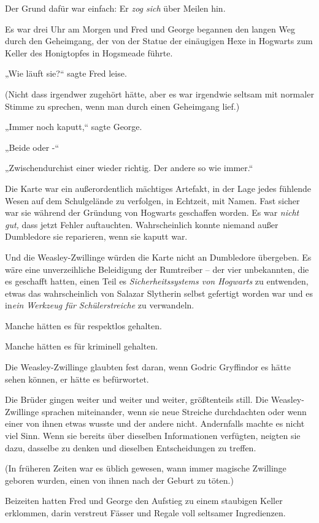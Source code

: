 {Der Grund dafür war einfach: Er \emph{zog sich} über Meilen hin.

Es war drei Uhr am Morgen und Fred und George begannen den langen Weg durch den Geheimgang, der von der Statue der einäugigen Hexe in Hogwarts zum Keller des Honigtopfes in Hogsmeade führte.

„Wie läuft sie?“ sagte Fred leise.

(Nicht dass irgendwer zugehört hätte, aber es war irgendwie seltsam mit normaler Stimme zu sprechen, wenn man durch einen Geheimgang lief.)

„Immer noch kaputt,“ sagte George.

„Beide oder -“

„Zwischendurchist einer wieder richtig. Der andere so wie immer.“

Die Karte war ein außerordentlich mächtiges Artefakt, in der Lage jedes fühlende Wesen auf dem Schulgelände zu verfolgen, in Echtzeit, mit Namen. Fast sicher war sie während der Gründung von Hogwarts geschaffen worden. Es war \emph{nicht gut,} dass jetzt Fehler auftauchten. Wahrscheinlich konnte niemand außer Dumbledore sie reparieren, wenn sie kaputt war.

Und die Weasley-Zwillinge würden die Karte nicht an Dumbledore übergeben. Es wäre eine unverzeihliche Beleidigung der Rumtreiber -- der vier unbekannten, die es geschafft hatten, einen Teil es \emph{Sicherheitssystems von Hogwarts} zu entwenden, etwas das wahrscheinlich von Salazar Slytherin selbst gefertigt worden war und es in\emph{ein Werkzeug für Schülerstreiche} zu verwandeln.

Manche hätten es für respektlos gehalten.

Manche hätten es für kriminell gehalten.

Die Weasley-Zwillinge glaubten fest daran, wenn Godric Gryffindor es hätte sehen können, er hätte es befürwortet.

Die Brüder gingen weiter und weiter und weiter, größtenteils still. Die Weasley-Zwillinge sprachen miteinander, wenn sie neue Streiche durchdachten oder wenn einer von ihnen etwas wusste und der andere nicht. Andernfalls machte es nicht viel Sinn. Wenn sie bereits über dieselben Informationen verfügten, neigten sie dazu, dasselbe zu denken und dieselben Entscheidungen zu treffen.

(In früheren Zeiten war es üblich gewesen, wann immer magische Zwillinge geboren wurden, einen von ihnen nach der Geburt zu töten.)

Beizeiten hatten Fred und George den Aufstieg zu einem staubigen Keller erklommen, darin verstreut Fässer und Regale voll seltsamer Ingredienzen.

}
